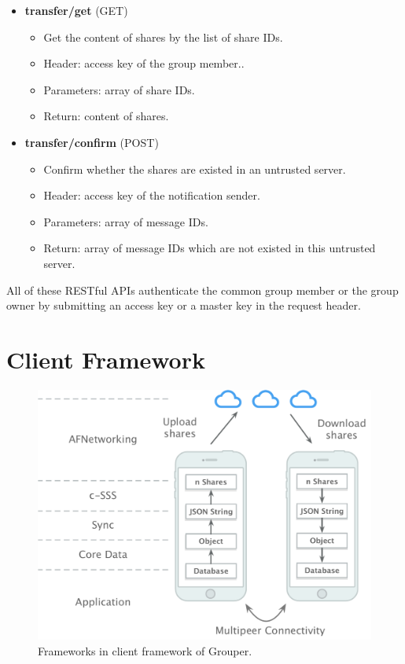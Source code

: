 \documentclass[a4paper,11pt]{report}
\begin{document}
\begin{itemize}[leftmargin=7mm]
\begin{itemize}
	\end{itemize}
	\item 
	\textbf{transfer/get} (GET)
	\begin{itemize}
		\item Get the content of shares by the list of share IDs.
		\item Header: access key of the group member..
		\item Parameters: array of share IDs.
		\item Return: content of shares.
	\end{itemize}
	\item 
	\textbf{transfer/confirm} (POST)
	\begin{itemize}
		\item Confirm whether the shares are existed in an untrusted server. 
		\item Header: access key of the notification sender.
		\item Parameters: array of message IDs.
		\item Return: array of message IDs which are not existed in this untrusted server.
	\end{itemize}
\end{itemize}

All of these RESTful APIs authenticate the common group member or the group owner by submitting an access key or a master key in the request header.

\section{Client Framework} \label{section:client_framework}

\begin{figure}
	\centering
	\includegraphics[scale=0.6]{frameworks}
	\caption{Frameworks in client framework of Grouper.}
	\label{fig:frameworks}
\end{figure}
\end{document}
